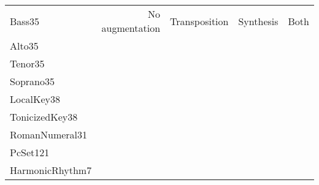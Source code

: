 
\begin{tabular}{lrrrr}
Bass35          &  No augmentation & Transposition & Synthesis & Both \\
Alto35          &                  &               &            &     \\  
Tenor35         &                  &               &            &     \\
Soprano35       &                  &               &            &     \\
LocalKey38      &                  &               &            &     \\
TonicizedKey38  &                  &               &            &     \\
RomanNumeral31  &                  &               &            &     \\
PcSet121        &                  &               &            &     \\
HarmonicRhythm7 &                  &               &            &     \\
\end{tabular}
